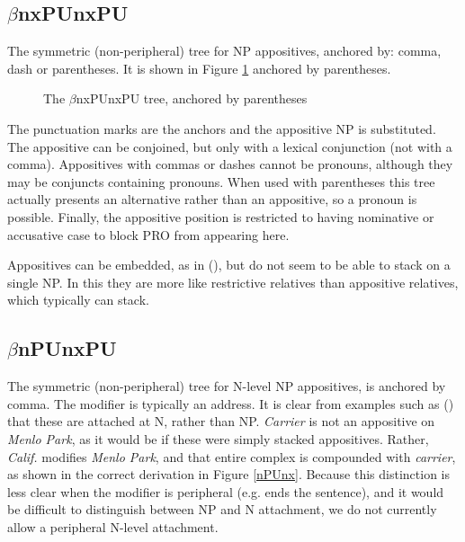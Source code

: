 \subsection{$\beta$nxPUnxPU}

The symmetric (non-peripheral) tree for NP appositives, anchored by:
comma, dash or parentheses. It is shown in Figure \ref{nxPUnxPU} anchored by
parentheses. 



\begin{figure}[hbt]
\centering
\hspace{0.0in}
\caption{The $\beta$nxPUnxPU tree, anchored by parentheses}
\label{nxPUnxPU}
\end{figure}


The punctuation marks are the anchors and the appositive NP is
substituted. The appositive can be conjoined, but only with a lexical
conjunction (not with a comma). Appositives with commas or dashes
cannot be pronouns, although they may be conjuncts containing
pronouns.  When used with
parentheses this tree actually presents an alternative rather than an
appositive, so a pronoun is possible. Finally, the appositive position
is restricted to having nominative or accusative case to block PRO
from appearing here.

Appositives can be embedded, as in (), but do not seem to be
able to stack on a single NP. In this they are more like restrictive
relatives than appositive relatives, which typically can stack.


\subsection{$\beta$nPUnxPU}

The symmetric (non-peripheral) tree for N-level NP appositives, is
anchored by comma. The modifier is typically an address.  It is clear
from examples such as () that these are attached at N, rather
than NP. {\it Carrier } is not an appositive on {\it Menlo Park}, as it
would be if these were simply stacked appositives. Rather, {\it
Calif.} modifies {\it Menlo Park}, and that entire complex is
compounded with {\it carrier}, as shown in the correct derivation in
Figure \ref{nPUnx}. Because this distinction is less clear when the
modifier is peripheral (e.g. ends the sentence), and it would be
difficult to distinguish between NP and N attachment, we do not
currently allow a peripheral N-level attachment.


